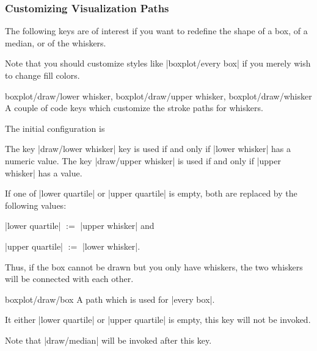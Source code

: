 \subsubsection{Customizing Visualization Paths}

The following keys are of interest if you want to redefine the shape of a box,
of a median, or of the whiskers.

Note that you should customize styles like |boxplot/every box| if you merely
wish to change fill colors.

\begin{pgfplotsxycodekeylist}{%
    boxplot/draw/lower whisker,
    boxplot/draw/upper whisker,
    boxplot/draw/whisker%
}
    A couple of code keys which customize the stroke paths for whiskers.

    The initial configuration is
\begin{codeexample}
\end{codeexample}

    The key |draw/lower whisker| key is used if and only if |lower whisker| has
    a numeric value. The key |draw/upper whisker| is used if and only if
    |upper whisker| has a value.

    If one of |lower quartile| or |upper quartile| is empty, both are replaced
    by the following values:

    |lower quartile| $:=$ |upper whisker| and

    |upper quartile| $:=$ |lower whisker|.

    Thus, if the box cannot be drawn but you only have whiskers, the two
    whiskers will be connected with each other.
\end{pgfplotsxycodekeylist}

\begin{pgfplotscodekey}{boxplot/draw/box}
    A path which is used for |every box|.
\begin{codeexample}
\end{codeexample}

    It either |lower quartile| or |upper quartile| is empty, this key will not
    be invoked.

    Note that |draw/median| will be invoked after this key.
\end{pgfplotscodekey}


